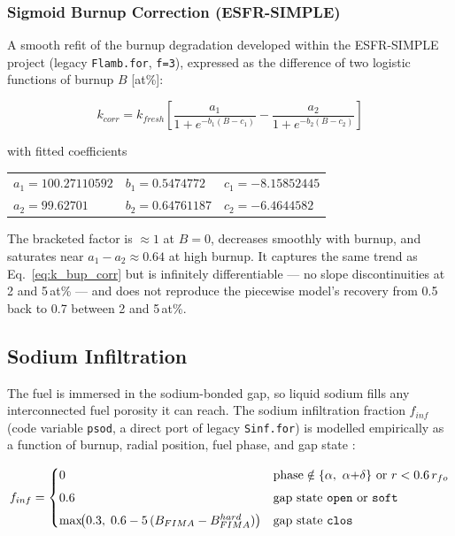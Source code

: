 \begin{refsection}
\subsubsection{Sigmoid Burnup Correction (ESFR-SIMPLE)}

A smooth refit of the burnup degradation developed within the ESFR-SIMPLE project (legacy \texttt{Flamb.for}, \texttt{f=3}), expressed as the difference of two logistic functions of burnup $B$ [at\%]:

\begin{equation}
  k_{corr} = k_{fresh}\left[
    \frac{a_1}{1 + e^{-b_1 (B - c_1)}} -
    \frac{a_2}{1 + e^{-b_2 (B - c_2)}}
  \right]
  \label{eq:k_esfr}
\end{equation}

with fitted coefficients

\begin{center}
\begin{tabular}{lll}
  $a_1 = 100.27110592$ & $b_1 = 0.5474772$  & $c_1 = -8.15852445$ \\
  $a_2 = 99.62701$     & $b_2 = 0.64761187$ & $c_2 = -6.4644582$
\end{tabular}
\end{center}

The bracketed factor is ${\approx}1$ at $B = 0$, decreases smoothly with burnup, and saturates near $a_1 - a_2 \approx 0.64$ at high burnup.  It captures the same trend as Eq.~\eqref{eq:k_bup_corr} but is infinitely differentiable --- no slope discontinuities at 2 and 5\,at\% --- and does not reproduce the piecewise model's recovery from 0.5 back to 0.7 between 2 and 5\,at\%.

\subsection{Sodium Infiltration}
\label{sec:sinf}

The fuel is immersed in the sodium-bonded gap, so liquid sodium fills any interconnected fuel porosity it can reach. The sodium infiltration fraction $f_{inf}$ (code variable \texttt{psod}, a direct port of legacy \texttt{Sinf.for}) is modelled empirically as a function of burnup, radial position, fuel phase, and gap state \cite{karahan2009}:

\begin{equation}
  f_{inf} = \begin{cases}
    0 & \text{phase} \notin \{\alpha,\ \alpha{+}\delta\} \ \text{or}\ r < 0.6\,r_{fo} \\[4pt]
    0.6 & \text{gap state \texttt{open} or \texttt{soft}} \\[4pt]
    \max\!\bigl(0.3,\; 0.6 - 5\,(B_{FIMA} - B_{FIMA}^{hard})\bigr) & \text{gap state \texttt{clos}}
  \end{cases}
  \label{eq:sinf}
\end{equation}


\end{refsection}
